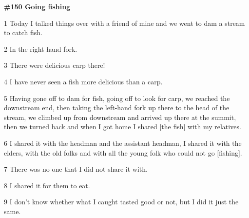 
\textbf{\#150 Going fishing}

1 Today I talked things over with a friend of mine and we went to dam a stream
to catch fish.

2 In the right-hand fork.

3 There were delicious carp there!

4 I have never seen a fish more delicious than a carp.

5 Having gone off to dam for fish, going off to look for carp, we reached the downstream
end, then taking the left-hand fork up there to the head of the stream, we climbed
up from downstream and arrived up there at the summit, then we turned back and
when I got home I shared [the fish] with my relatives.

6 I shared it with the headman and the assistant headman, I shared it with the
elders, with the old folks and with all the young folk who could not go [fishing].

7 There was no one that I did not share it with.

8 I shared it for them to eat.

9 I don't know whether what I caught tasted good or not, but I did it just the
same.


